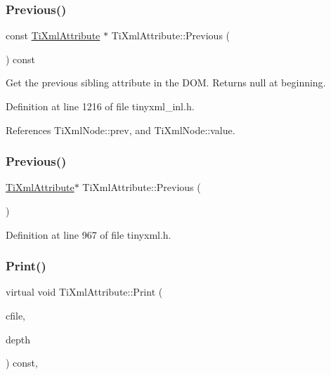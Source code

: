 \subsubsection{\texorpdfstring{Previous()}{Previous()}\hspace{0.1cm}{\footnotesize\ttfamily [1/2]}}
{\footnotesize\ttfamily const \hyperlink{class_ti_xml_attribute}{Ti\+Xml\+Attribute} $\ast$ Ti\+Xml\+Attribute\+::\+Previous (\begin{DoxyParamCaption}{ }\end{DoxyParamCaption}) const}



Get the previous sibling attribute in the D\+OM. Returns null at beginning. 



Definition at line 1216 of file tinyxml\+\_\+inl.\+h.



References Ti\+Xml\+Node\+::prev, and Ti\+Xml\+Node\+::value.

\hypertarget{class_ti_xml_attribute_ae4dabc932cba945ed1e92fec5f121193}{}\label{class_ti_xml_attribute_ae4dabc932cba945ed1e92fec5f121193} 
\subsubsection{\texorpdfstring{Previous()}{Previous()}\hspace{0.1cm}{\footnotesize\ttfamily [2/2]}}
{\footnotesize\ttfamily \hyperlink{class_ti_xml_attribute}{Ti\+Xml\+Attribute}$\ast$ Ti\+Xml\+Attribute\+::\+Previous (\begin{DoxyParamCaption}{ }\end{DoxyParamCaption})\hspace{0.3cm}{\ttfamily [inline]}}



Definition at line 967 of file tinyxml.\+h.

\hypertarget{class_ti_xml_attribute_a68ae373e03b9c35be4c9d0c3c233b894}{}\label{class_ti_xml_attribute_a68ae373e03b9c35be4c9d0c3c233b894} 
\subsubsection{\texorpdfstring{Print()}{Print()}\hspace{0.1cm}{\footnotesize\ttfamily [1/2]}}
{\footnotesize\ttfamily virtual void Ti\+Xml\+Attribute\+::\+Print (\begin{DoxyParamCaption}\item[{F\+I\+LE $\ast$}]{cfile,  }\item[{int}]{depth }\end{DoxyParamCaption}) const\hspace{0.3cm}{\ttfamily [inline]}, {\ttfamily [virtual]}}

